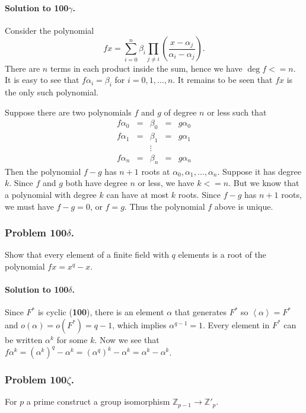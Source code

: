 \paragraph{Solution to 100$\gamma$.}
Consider the polynomial
$$
fx = \sum_{i=0}^n \beta_i \prod_{j \neq i}
	\left( \frac{x-\alpha_j}{\alpha_i-\alpha_j} \right).
$$
There are $n$ terms in each product inside the sum, hence we have
$\deg f <= n$. It is easy to see that $f\alpha_i = \beta_i$ for
$i = 0, 1, \dots, n$. It remains to be seen that $fx$ is the only such
polynomial.

Suppose there are two polynomials $f$ and $g$ of degree $n$ or less such that
$$
\begin{array}{ccccc}
f\alpha_0&=&\beta_0&=&g\alpha_0 \\
f\alpha_1&=&\beta_1&=&g\alpha_1 \\
& & \vdots & & \\
f\alpha_n&=&\beta_n&=&g\alpha_n
\end{array}
$$
Then the polynomial $f-g$ has $n+1$ roots at $\alpha_0, \alpha_1, \dots, \alpha_n$.
Suppose it has degree $k$. Since $f$ and $g$ both have degree $n$ or less, we
have $k <= n$. But we know that a polynomial with degree $k$ can have at most
$k$ roots. Since $f-g$ has $n+1$ roots, we must have $f-g=0$, or $f=g$. Thus
the polynomial $f$ above is unique.

\subsubsection{Problem 100$\delta$.}
Show that every element of a finite field with $q$ elements is a root of the
polynomial $fx = x^q - x$.

\paragraph*{Solution to 100$\delta$.}
Since $F^*$ is cyclic (\textbf{100}), there is an element $\alpha$ that generates
$F^*$ so $\left<\alpha\right> = F^*$ and $o(\alpha) = o(F^*) = q-1$, which implies
$\alpha^{q-1} = 1$. Every element in $F^*$ can be written $\alpha^k$ for some $k$.
Now we see that $f\alpha^k = (\alpha^k)^q - \alpha^k = (\alpha^q)^k - \alpha^k
= \alpha^k - \alpha^k$.

\subsubsection{Problem 100$\zeta$.}
For $p$ a prime construct a group isomorphism $\mathbb{Z}_{p-1} \rightarrow \mathbb{Z}'_p$.

